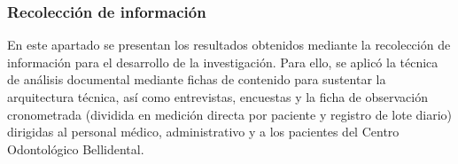 \subsubsection{Recolección de información}

En este apartado se presentan los resultados obtenidos mediante la recolección de información para el desarrollo de la investigación. Para ello, se aplicó la técnica de análisis documental mediante fichas de contenido para sustentar la arquitectura técnica, así como entrevistas, encuestas y la ficha de observación cronometrada (dividida en medición directa por paciente y registro de lote diario) dirigidas al personal médico, administrativo y a los pacientes del Centro Odontológico Bellidental.








